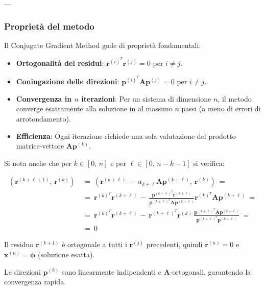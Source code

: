 ---

\subsubsection{Proprietà del metodo}
Il Conjugate Gradient Method gode di proprietà fondamentali:
\begin{itemize}
	\item \textbf{Ortogonalità dei residui}: $\mathbf{r}^{(i)^T} \mathbf{r}^{(j)} = 0$ per $i \neq j$.
	\item \textbf{Coniugazione delle direzioni}: $\mathbf{p}^{(i)^T} \mathbf{A} \mathbf{p}^{(j)} = 0$ per $i \neq j$.
	\item \textbf{Convergenza in $n$ iterazioni}: Per un sistema di dimensione $n$, il metodo converge esattamente alla soluzione in al massimo $n$ passi (a meno di errori di arrotondamento).
	\item \textbf{Efficienza}: Ogni iterazione richiede una sola valutazione del prodotto matrice-vettore $\mathbf{A} \mathbf{p}^{(k)}$.
\end{itemize}

Si nota anche che per $k\in [0,\, n]$ e per $\ell\in [0,\, n-k-1]$ si verifica:

\[
\begin{aligned}
	(\mathbf r^{(k+\ell+1)},\, \mathbf r^{(k)})\ &=\ (\mathbf r^{(k+\ell)}\, -\, \alpha_{k+\ell}\mathbf A \mathbf p^{(k+\ell)}, \ \mathbf r^{(k)})\ =\\
	&=\ \mathbf r^{(k)^T} \mathbf r^{(k+\ell)}\, -\, \frac{\mathbf p^{(k+\ell)^T} \mathbf r^{(k+\ell)}}{\mathbf p^{(k+\ell)^T} \mathbf A \mathbf p^{(k+\ell)}} \mathbf r^{(k)^T} \mathbf A \mathbf p^{(k+\ell)}\ =\\
	& =\ \mathbf r^{(k)^T} \mathbf r^{(k+\ell)}\, -\, 
	\mathbf r^{(k+\ell)^T} \mathbf r^{(k)}\,
	\frac{\mathbf p^{(k+\ell)^T} \mathbf A \mathbf p^{(k+\ell)}}{\mathbf p^{(k+\ell)^T} \mathbf p^{(k+\ell)}} \ =\\
	& =\ 0
\end{aligned}
\]

Il residuo $\mathbf{r}^{(k+1)}$ è ortogonale a tutti i $\mathbf{r}^{(j)}$ precedenti, quindi $\mathbf{r}^{(n)} = 0$ e $\mathbf{x}^{(n)} = \mathbf{\phi}$ (soluzione esatta).

Le direzioni $\mathbf{p}^{(k)}$ sono linearmente indipendenti e $\mathbf{A}$-ortogonali, garantendo la convergenza rapida.


